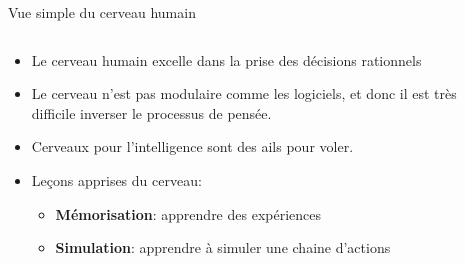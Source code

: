 \documentclass{beamer}
\begin{document}
\begin{frame}[t]{Vue simple du cerveau humain}
  \begin{columns}
    \begin{column}{0.5\textwidth}
      {\small
        \begin{itemize}
           
          \item Le cerveau humain excelle dans la prise des décisions rationnels 
          \item Le cerveau n'est pas modulaire comme les logiciels, et donc il
            est très difficile
    inverser le processus de pensée.
  \item<2-> Cerveaux pour l'intelligence sont des ails pour voler.
  \item<2-> Leçons apprises du cerveau: 
    \begin{itemize}
      \scriptsize
    \item \alert{\textbf{Mémorisation}}: apprendre des expériences
    \item \alert{\textbf{Simulation}}:  apprendre à  simuler une chaine d'actions
    \end{itemize}
        \end{itemize}
      }
    \end{column}
    \begin{column}{0.5\textwidth}
    \end{column}
  \end{columns}
\end{frame}
\end{document}
